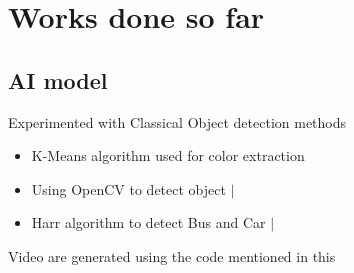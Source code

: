 \documentclass{beamer}
\newcommand{\link}[2]{\href{#1}{\textit{\color{blue}{#2}}}}%
\begin{document}

	\section{Works done so far}
	\subsection{AI model}
	\begin{frame}{Experimented with Classical Object detection methods}
		\begin{itemize}
			\item K-Means algorithm used for color extraction
				\link{https://github.com/Project-Dragon-Fly/tutorial-trials/blob/tutorial\_testing/Color\%20detection.ipynb}{notebook}
			
			\item Using OpenCV to detect object  
				\link{https://github.com/Project-Dragon-Fly/tutorial-trials/blob/tutorial\_testing/OpenCV-image-difference.ipynb}{notebook} $|$ 
				\link{https://drive.google.com/file/d/1-2EAoUBxMzfnMO3tVJFJ0qvGnXMFp4zL/view}{video}
			
			\item Harr algorithm to detect Bus and Car
				\link{https://github.com/Project-Dragon-Fly/tutorial-trials/blob/tutorial\_testing/OpenCV\%20-\%20Haar\%20algo.ipynb}{notebook} $|$
				\link{https://drive.google.com/file/d/1XYbVf6I2ZJSSdO2SsZECK9rNoYQwROM9/view}{video}
		\end{itemize}
		\begin{small}
			Video are generated using the code mentioned in this \link{https://github.com/Project-Dragon-Fly/tutorial-trials/blob/tutorial\_testing/Detection\_video\_generator.ipynb}{notebook}
		\end{small}
	\end{frame}
\end{document}
